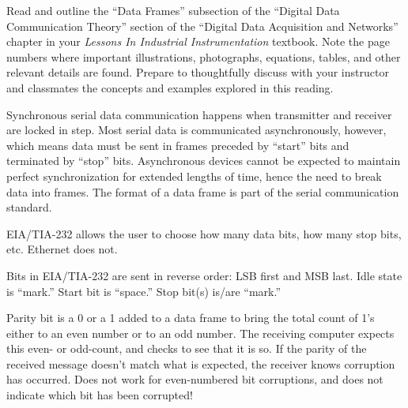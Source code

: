 

Read and outline the ``Data Frames'' subsection of the ``Digital Data Communication Theory'' section of the ``Digital Data Acquisition and Networks'' chapter in your {\it Lessons In Industrial Instrumentation} textbook.  Note the page numbers where important illustrations, photographs, equations, tables, and other relevant details are found.  Prepare to thoughtfully discuss with your instructor and classmates the concepts and examples explored in this reading.














Synchronous serial data communication happens when transmitter and receiver are locked in step.  Most serial data is communicated asynchronously, however, which means data must be sent in frames preceded by ``start'' bits and terminated by ``stop'' bits.  Asynchronous devices cannot be expected to maintain perfect synchronization for extended lengths of time, hence the need to break data into frames.  The format of a data frame is part of the serial communication standard.

\vskip 10pt

EIA/TIA-232 allows the user to choose how many data bits, how many stop bits, etc.  Ethernet does not.  

\vskip 10pt

Bits in EIA/TIA-232 are sent in reverse order: LSB first and MSB last.  Idle state is ``mark.''  Start bit is ``space.''  Stop bit(s) is/are ``mark.''  

\vskip 10pt

Parity bit is a 0 or a 1 added to a data frame to bring the total count of 1's either to an even number or to an odd number.  The receiving computer expects this even- or odd-count, and checks to see that it is so.  If the parity of the received message doesn't match what is expected, the receiver knows corruption has occurred.  Does not work for even-numbered bit corruptions, and does not indicate which bit has been corrupted!

